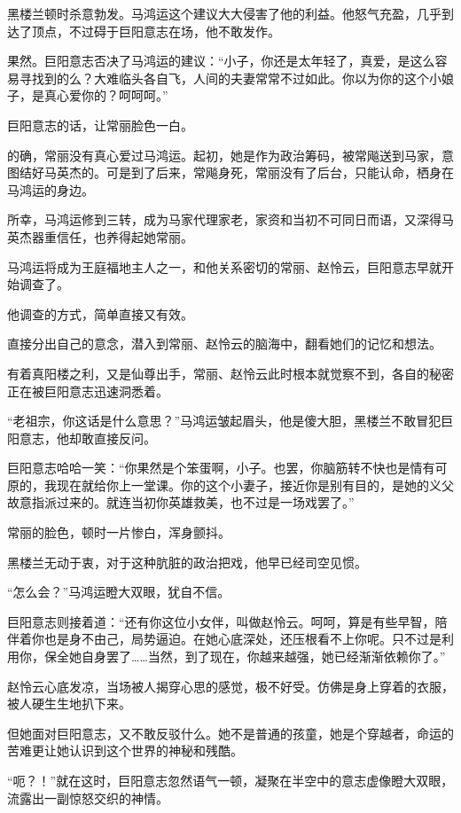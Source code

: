 \begin{this_body}
黑楼兰顿时杀意勃发。马鸿运这个建议大大侵害了他的利益。他怒气充盈，几乎到达了顶点，不过碍于巨阳意志在场，他不敢发作。

果然。巨阳意志否决了马鸿运的建议：“小子，你还是太年轻了，真爱，是这么容易寻找到的么？大难临头各自飞，人间的夫妻常常不过如此。你以为你的这个小娘子，是真心爱你的？呵呵呵。”

巨阳意志的话，让常丽脸色一白。

的确，常丽没有真心爱过马鸿运。起初，她是作为政治筹码，被常飚送到马家，意图结好马英杰的。可是到了后来，常飚身死，常丽没有了后台，只能认命，栖身在马鸿运的身边。

所幸，马鸿运修到三转，成为马家代理家老，家资和当初不可同日而语，又深得马英杰器重信任，也养得起她常丽。

马鸿运将成为王庭福地主人之一，和他关系密切的常丽、赵怜云，巨阳意志早就开始调查了。

他调查的方式，简单直接又有效。

直接分出自己的意念，潜入到常丽、赵怜云的脑海中，翻看她们的记忆和想法。

有着真阳楼之利，又是仙尊出手，常丽、赵怜云此时根本就觉察不到，各自的秘密正在被巨阳意志迅速洞悉着。

“老祖宗，你这话是什么意思？”马鸿运皱起眉头，他是傻大胆，黑楼兰不敢冒犯巨阳意志，他却敢直接反问。

巨阳意志哈哈一笑：“你果然是个笨蛋啊，小子。也罢，你脑筋转不快也是情有可原的，我现在就给你上一堂课。你的这个小妻子，接近你是别有目的，是她的义父故意指派过来的。就连当初你英雄救美，也不过是一场戏罢了。”

常丽的脸色，顿时一片惨白，浑身颤抖。

黑楼兰无动于衷，对于这种肮脏的政治把戏，他早已经司空见惯。

“怎么会？”马鸿运瞪大双眼，犹自不信。

巨阳意志则接着道：“还有你这位小女伴，叫做赵怜云。呵呵，算是有些早智，陪伴着你也是身不由己，局势逼迫。在她心底深处，还压根看不上你呢。只不过是利用你，保全她自身罢了……当然，到了现在，你越来越强，她已经渐渐依赖你了。”

赵怜云心底发凉，当场被人揭穿心思的感觉，极不好受。仿佛是身上穿着的衣服，被人硬生生地扒下来。

但她面对巨阳意志，又不敢反驳什么。她不是普通的孩童，她是个穿越者，命运的苦难更让她认识到这个世界的神秘和残酷。

“呃？！”就在这时，巨阳意志忽然语气一顿，凝聚在半空中的意志虚像瞪大双眼，流露出一副惊怒交织的神情。


\end{this_body}
